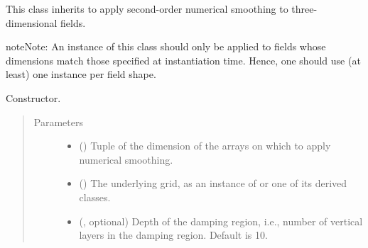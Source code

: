 \documentclass[letterpaper,10pt,english]{sphinxmanual}
\begin{document}

\begin{fulllineitems}
\label{\detokenize{api:dycore.horizontal_smoothing.HorizontalSmoothingSecondOrderXYZ}}
This class inherits {\hyperref[\detokenize{api:dycore.horizontal_smoothing.HorizontalSmoothing}]{}} to apply second-order numerical smoothing to
three-dimensional fields.

\begin{sphinxadmonition}{note}{Note:}
An instance of this class should only be applied to fields whose dimensions match those specified at instantiation time.
Hence, one should use (at least) one instance per field shape.
\end{sphinxadmonition}

\begin{fulllineitems}
\label{\detokenize{api:dycore.horizontal_smoothing.HorizontalSmoothingSecondOrderXYZ.__init__}}
Constructor.
\begin{quote}\begin{description}
\item[{Parameters}] \leavevmode\begin{itemize}
\item {} 
 () \textendash{} Tuple of the dimension of the arrays on which to apply numerical smoothing.

\item {} 
 () \textendash{} The underlying grid, as an instance of {\hyperref[\detokenize{api:grids.grid_xyz.GridXYZ}]{}} or one of its derived classes.

\item {} 
 (, optional) \textendash{} Depth of the damping region, i.e., number of vertical layers in the damping region. Default is 10.


\end{itemize}
\end{description}
\end{quote}
\end{fulllineitems}
\end{fulllineitems}
\end{document}

